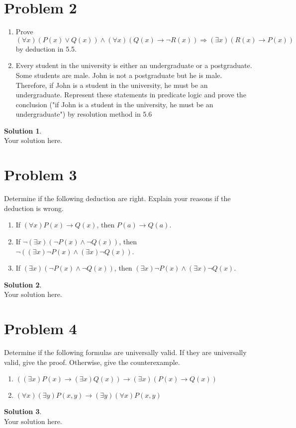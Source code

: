 \documentclass[a4paper,UTF8]{article}
\theoremstyle{definition}
\newtheorem*{solution}{Solution}
\begin{document}
\section*{Problem 2}
\begin{enumerate}
\item Prove $(\forall x)( P(x)\vee Q(x) )\wedge (\forall x)( Q(x)\rightarrow\neg R(x) )\Rightarrow(\exists x)( R(x)\rightarrow P(x) )$ by deduction in 5.5.
\item Every student in the university is either an undergraduate or a postgraduate. Some students are male. John is not a postgraduate but he is male. Therefore, if John is a student in the university, he must be an undergraduate. Represent these statements in predicate logic and prove the conclusion ("if John is a student in the university, he must be an undergraduate") by resolution method in 5.6
\end{enumerate} 
\begin{solution}
~\\
Your solution here.
\end{solution}


\section*{Problem 3}
Determine if the following deduction are right. Explain your reasons if the deduction is wrong.
\begin{enumerate}
\item If $(\forall x)P(x)\rightarrow Q(x)$, then $P(a)\rightarrow Q(a)$.
\item If $\neg(\exists x)( \neg P(x)\wedge\neg Q(x) )$, then $\neg( (\exists x)\neg P(x)\wedge (\exists x)\neg Q(x) )$.
\item If $(\exists x)( \neg P(x)\wedge\neg Q(x) )$, then $(\exists x)\neg P(x)\wedge (\exists x)\neg Q(x)$.
\end{enumerate}
\begin{solution}
~\\
Your solution here.
\end{solution}


\section*{Problem 4}
Determine if the following formulas are universally valid. If they are universally valid, give the proof. Otherwise, give the counterexample.
\begin{enumerate}
\item $( (\exists x)P(x)\rightarrow (\exists x)Q(x) )\rightarrow(\exists x)( P(x)\rightarrow Q(x) )$
\item $(\forall x)(\exists y)P(x,y)\rightarrow (\exists y)(\forall x)P(x,y) $
\end{enumerate}
\begin{solution}
~\\
Your solution here.
\end{solution}
\end{document}
